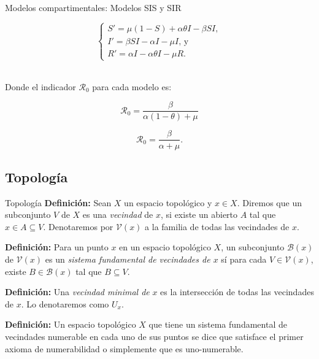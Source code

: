 \documentclass[9pt]{beamer}
\begin{document}
\begin{frame}{Modelos compartimentales: Modelos SIS y SIR}
\begin{minipage}{0.48\textwidth}
\end{minipage}
\hfill
\begin{minipage}{0.48\textwidth}
\begin{equation*}\label{eq:Modelo SIR}
\left\{
\begin{array}{l}
S' = \mu(1 - S) + \alpha\theta I - \beta S I, \\
I' = \beta S I - \alpha I - \mu I\text{, y } \\
R' = \alpha I - \alpha\theta I - \mu R.
\end{array}
\right.
\end{equation*}
\end{minipage}\\
Donde el indicador $\mathcal{R}_0$ para cada modelo es:\\
\begin{minipage}{0.48\textwidth}
$$\mathcal{R}_0 = \frac{\beta}{\alpha(1-\theta)+\mu}$$
\end{minipage}
\hfill
\begin{minipage}{0.48\textwidth}
$$\mathcal{R}_0 = \frac{\beta}{\alpha+\mu}.$$
\end{minipage}
\end{frame}

\subsection{Topología}
\begin{frame}{Topología}
\textbf{Definición:} Sean $X$ un espacio topológico y $x\in X$. Diremos que un subconjunto $V$ de $X$ es una \textit{vecindad} de $x$, si existe un abierto $A$ tal que $x\in A\subseteq V$. Denotaremos por $\mathcal{V}(x)$ a la familia de todas las vecindades de $x$.

\textbf{Definición:} Para un punto $x$ en un espacio topológico $X$, un subconjunto $\mathcal{B}(x)$ de $\mathcal{V}(x)$ es un \textit{sistema fundamental de vecindades de $x$} sí para cada $V\in\mathcal{V}(x)$, existe $B\in\mathcal{B}(x)$ tal que $B\subseteq V$. 

\textbf{Definición:} Una \textit{vecindad minimal de} $x$ es la intersección de todas las vecindades de $x$. Lo denotaremos como $U_x$.

\textbf{Definición:} Un espacio topológico $X$ que tiene un sistema fundamental de vecindades numerable en cada uno de sus puntos se dice que satisface el primer axioma de numerabilidad o simplemente que es uno-numerable.
\end{frame}
\end{document}
